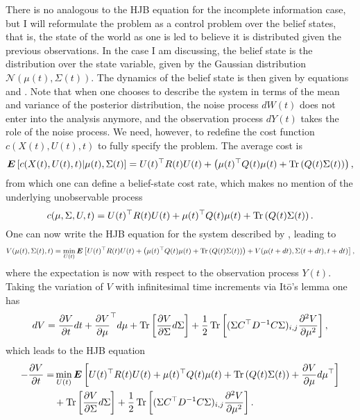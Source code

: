 There is no analogous to the HJB equation for the incomplete information case, but I will reformulate the problem as a control problem over the belief states, that is, the state of the world as one is led to believe it is distributed given the previous observations. In the case I am discussing, the belief state is the distribution over the state variable, given by the Gaussian distribution $\mathcal{N}(\mu(t),\Sigma(t))$. The dynamics of the belief state is then given by equations  and . Note that when one chooses to describe the system in terms of the mean and variance of the posterior distribution, the noise process $dW(t)$ does not enter into the analysis anymore, and the observation process $dY(t)$ takes the role of the noise process. We need, however, to redefine the cost function $c(X(t),U(t),t)$ to fully specify the problem. The average cost is
$$
\boldsymbol{E}\left[c(X(t),U(t),t)\middle|\mu(t),\Sigma(t) \right] = U(t)^\top R(t) U(t) +\left(\mu(t)^\top Q(t) \mu(t) + \operatorname{Tr}\left(Q(t)\Sigma(t)\right)\right),
$$
from which one can define a belief-state cost rate, which makes no mention of the underlying unobservable process
\[
c(\mu,\Sigma,U,t) =  U(t)^\top R(t) U(t) +\mu(t)^\top Q(t) \mu(t) + \operatorname{Tr}\left(Q(t)\Sigma(t)\right).
\]
One can now write the HJB equation for the system described by , leading to
$$
V(\mu(t),\Sigma(t),t) = \min_{U(t)} \boldsymbol{E}\left[ U(t)^\top R(t) U(t)+\left(\mu(t)^\top Q(t) \mu(t) + \operatorname{Tr}\left(Q(t)\Sigma(t)\right)\right)+V(\mu(t+dt),\Sigma(t+dt),t+dt)\right],
$$
where the expectation is now with respect to the observation process $Y(t)$.
Taking the variation of $V$ with infinitesimal time increments via It\=o's lemma one has
$$
dV = \frac{\partial V}{\partial t} dt + \frac{\partial V}{\partial \mu}^\top d\mu + \operatorname{Tr}\left[\frac{\partial V}{\partial \Sigma}d\Sigma\right] +\frac{1}{2} \operatorname{Tr}\left[(\Sigma C^\top D^{-1} C 
\Sigma)_{i,j} \frac{\partial^2 V}{\partial \mu^2}\right],
$$
which leads to the HJB equation
\begin{eqnarray*}
-\frac{\partial V}{\partial t} =& \min_{U(t)} \boldsymbol{E}\left[ U(t)^\top R(t) U(t)+\mu(t)^\top Q(t) \mu(t) + \operatorname{Tr}\left(Q(t)\Sigma(t)\right) +\frac{\partial V}{\partial \mu}d\mu^\top\right] \\&+ \operatorname{Tr}\left[\frac{\partial V}{\partial \Sigma}d\Sigma\right] +\frac{1}{2} \operatorname{Tr}\left[(\Sigma C^\top D^{-1} C \Sigma)_{i,j} \frac{\partial^2 V}{\partial \mu^2}\right] .
\end{eqnarray*}
